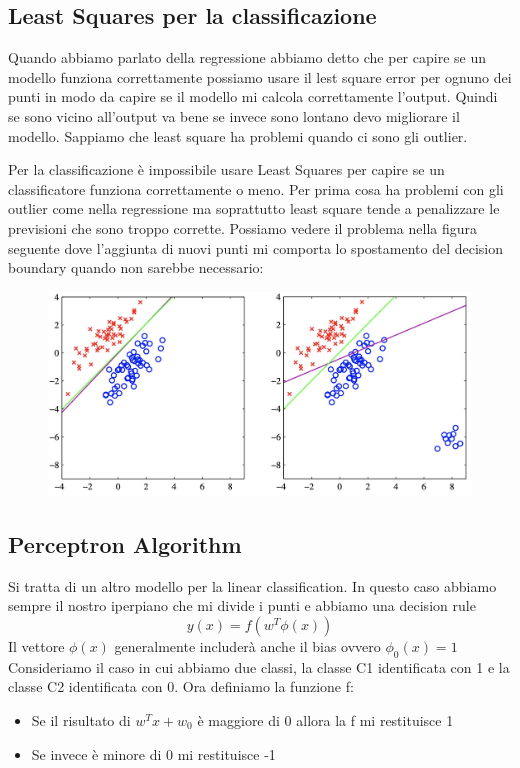 \documentclass[14pt]{extreport}
\begin{document}
\subsection{Least Squares per la classificazione}

Quando abbiamo parlato della regressione abbiamo detto che per capire se un modello funziona correttamente possiamo usare il lest square error per
ognuno dei punti in modo da capire se il modello mi calcola correttamente l'output. Quindi se sono vicino all'output va bene se invece sono lontano
devo migliorare il modello. Sappiamo che least square ha problemi quando ci sono gli outlier.

Per la classificazione è impossibile usare Least Squares per capire se un classificatore funziona correttamente o meno. Per prima cosa ha problemi con
gli outlier come nella regressione ma soprattutto least square tende a penalizzare le previsioni che sono troppo corrette. Possiamo vedere il problema
nella figura seguente dove l'aggiunta di nuovi punti mi comporta lo spostamento del decision boundary quando non sarebbe necessario:

\begin{figure}[H]
	\centering
	\includegraphics[width=0.7\linewidth]{196.jpeg}
\end{figure}

\subsection{Perceptron Algorithm}

Si tratta di un altro modello per la linear classification. In questo caso abbiamo sempre il nostro iperpiano che mi divide i punti e abbiamo una
decision rule $$y(x) = f(w^T\phi(x))$$ Il vettore $\phi(x)$ generalmente includerà anche il bias ovvero $\phi_0(x)=1$ Consideriamo il caso in cui
abbiamo due classi, la classe C1 identificata con 1 e la classe C2 identificata con 0. Ora definiamo la funzione f:
\begin{itemize}
	\item Se il risultato di $w^Tx + w_0$ è maggiore di 0 allora la f mi restituisce 1
	\item Se invece è minore di 0 mi restituisce -1
\end{itemize}
\end{document}
